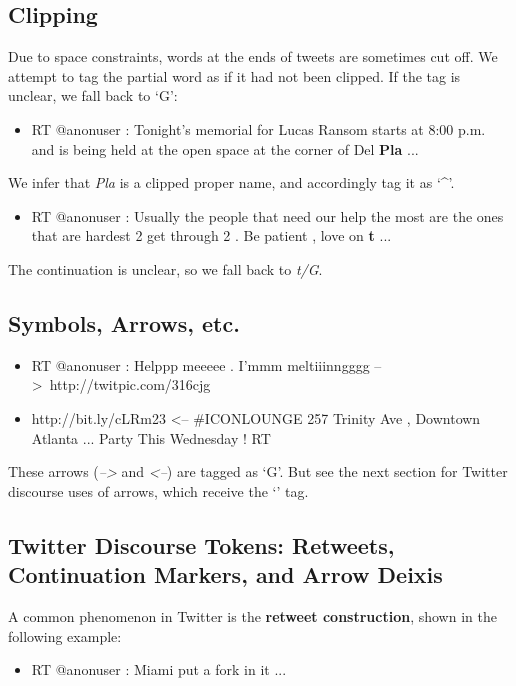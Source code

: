 \documentclass[11pt,letterpaper]{article}
\begin{document}
\subsection{Clipping}

Due to space constraints, words at the ends of tweets are sometimes cut off. We attempt to tag the partial word as if it had not been clipped. If the tag is unclear, 
we fall back to `G':
\begin{itemize}
\item RT @anonuser : Tonight's memorial for Lucas Ransom starts at 8:00 p.m. and is being held at the open space at the corner of Del \textbf{Pla} ...  
\end{itemize}
\noindent We infer that \emph{Pla} is a clipped proper name, and accordingly tag it as `\textasciicircum'.

\begin{itemize}
\item RT @anonuser : Usually the people that need our help the most are the ones that are hardest 2 get through 2 . Be patient , love on \textbf{t} ...
\end{itemize}
\noindent The continuation is unclear, so we fall back to \emph{t/G}.

\subsection{Symbols, Arrows, etc.}

\begin{itemize}
\item RT @anonuser : Helppp meeeee . I'mmm meltiiinngggg --\textgreater\ http://twitpic.com/316cjg
\item http://bit.ly/cLRm23 \textless -- \#ICONLOUNGE 257 Trinity Ave , Downtown Atlanta ... Party This Wednesday ! RT
\end{itemize}

These arrows (\emph{--\textgreater} and \emph{\textless --}) are tagged as `G'. But see the next section for Twitter discourse uses of arrows, which receive the `\texttildelow' tag.

\subsection{Twitter Discourse Tokens: Retweets, Continuation Markers, and Arrow Deixis}

A common phenomenon in Twitter is the \textbf{retweet construction}, shown in the following example:
\begin{itemize}
\item RT @anonuser : Miami put a fork in it ...
\end{itemize}
\end{document}

